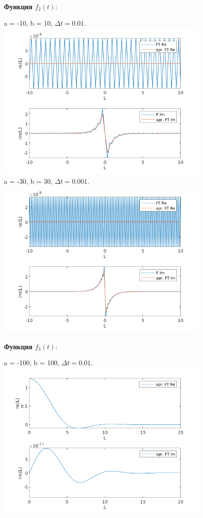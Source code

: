 \documentclass[11pt]{article}
\begin{document}
	\newpage
	{\hspace{-1cm}\bf \large Функция  $f_2(t):$}
	\begin{center}
		{a = -10, b = 10, $\Delta t = 0.01.$}
		\newline
		\includegraphics[width=0.8\textwidth]{f2_10_10.png}\\
		{a = -30, b = 30, $\Delta t = 0.001.$}
		\newline
		\includegraphics[width=0.8\textwidth]{f2_30_30.png}\\	
	\end{center}
	\newpage
	{\hspace{-1cm}\bf \large Функция $f_3(t):$}
	\begin{center}
		{a = -100, b = 100, $\Delta t = 0.01.$}
		\newline
		\includegraphics[width=0.8\textwidth]{f3.png}\\
	\end{center}
\end{document}
